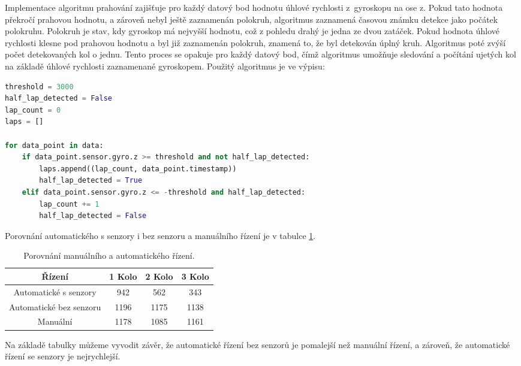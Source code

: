Implementace algoritmu prahování zajišťuje pro každý datový bod hodnotu úhlové
rychlosti z~gyroskopu na ose z. Pokud tato hodnota překročí prahovou hodnotu, a
zároveň nebyl ještě zaznamenán polokruh, algoritmus zaznamená časovou známku detekce
jako počátek polokruhu. Polokruh je stav, kdy gyroskop má nejvyšší hodnotu, což z pohledu drahý je jedna ze dvou zatáček. Pokud hodnota úhlové rychlosti klesne pod prahovou hodnotu a
byl již zaznamenán polokruh, znamená to, že byl detekován úplný kruh. Algoritmus
poté zvýší počet detekovaných kol o jednu. Tento proces se opakuje pro každý datový
bod, čímž algoritmus umožňuje sledování a počítání ujetých kol na základě úhlové rychlosti
zaznamenané gyroskopem. Použitý algoritmus je ve výpisu:

\begin{lstlisting}[language = python, caption = Počet kol, label = lst:countLap]
threshold = 3000
half_lap_detected = False
lap_count = 0
laps = []

for data_point in data:
    if data_point.sensor.gyro.z >= threshold and not half_lap_detected:
        laps.append((lap_count, data_point.timestamp))
        half_lap_detected = True
    elif data_point.sensor.gyro.z <= -threshold and half_lap_detected:
        lap_count += 1
        half_lap_detected = False
\end{lstlisting}

Porovnání automatického s senzory i bez senzoru a manuálního řízení je v tabulce \ref{tab:Comparison}.
\begin{table}[!h]
    \centering
    \begin{tabular}{cccc}
        \hline
        \textbf{Řízení} & \textbf{1 Kolo} & \textbf{2 Kolo} & \textbf{3 Kolo} \\
        \hline
        Automatické s senzory          & 942       & 562 & 343          \\
        Automatické bez senzoru & 1196 & 1175 & 1138 \\
        Manuální 			  & 1178       & 1085 & 1161           \\
        \hline
    \end{tabular}
    \caption{Porovnání manuálního a automatického řízení.}
    \label{tab:Comparison}
\end{table}


Na základě tabulky můžeme vyvodit závěr, že automatické řízení bez senzorů je pomalejší než manuální řízení, a zároveň, že automatické řízení se senzory je nejrychlejší.

\endinput
